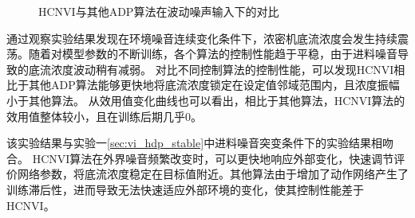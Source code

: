 \begin{figure}[htb]
\centering 
\caption{HCNVI与其他ADP算法在波动噪声输入下的对比}
    \label{fig:noise_HCNVI_HDP}
\end{figure}


通过观察实验结果发现在环境噪音连续变化条件下，浓密机底流浓度会发生持续震荡。随着对模型参数的不断训练，各个算法的控制性能趋于平稳，由于进料噪音导致的底流浓度波动稍有减弱。
对比不同控制算法的控制性能，可以发现HCNVI相比于其他ADP算法能够更快地将底流浓度锁定在设定值邻域范围内，且浓度振幅小于其他算法。
从效用值变化曲线也可以看出，相比于其他算法，HCNVI算法的效用值整体较小，且在训练后期几乎0。

该实验结果与实验一\ref{sec:vi_hdp_stable}中进料噪音突变条件下的实验结果相吻合。
HCNVI算法在外界噪音频繁改变时，可以更快地响应外部变化，快速调节评价网络参数，将底流浓度稳定在目标值附近。其他算法由于增加了动作网络产生了训练滞后性，进而导致无法快速适应外部环境的变化，使其控制性能差于HCNVI。


